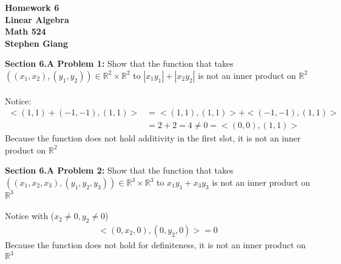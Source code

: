 \documentclass[12pt]{article}
\begin{document}
	
	\begin{center}
		\textbf{Homework 6} \\
		\textbf{Linear Algebra} \\
		\textbf{Math 524} \\
		\textbf{Stephen Giang} \\
	\end{center}

\noindent \textbf{Section 6.A Problem 1: }Show that the function that takes $\left((x_1,x_2),(y_1,y_2)\right) \in \mathbb{R}^2 \times \mathbb{R}^2$ to $|x_1y_1| + |x_2y_2|$ is not an inner product on $\mathbb{R}^2$
\\ \\
Notice: 
	\begin{align*}
		<(1,1) + (-1,-1) , (1,1)> &= <(1,1),(1,1)> + <(-1,-1),(1,1)> \\
		&=2 + 2 = 4 \not = 0 = <(0,0),(1,1)>
	\end{align*}
Because the function does not hold additivity in the first slot, it is not an inner product on $\mathbb{R}^2$

\vspace{\baselineskip}
\vspace{\baselineskip}
\vspace{\baselineskip}

\noindent \textbf{Section 6.A Problem 2: }Show that the function that takes $\left((x_1,x_2,x_3),(y_1,y_2,y_3)\right) \in \mathbb{R}^3 \times \mathbb{R}^3$ to $x_1y_1 + x_3y_3$ is not an inner product on $\mathbb{R}^3$ 
\\ \\
Notice with ($x_2 \not = 0, y_2 \not = 0$)
	\begin{align*}
		<(0,x_2,0),(0,y_2,0)> = 0
	\end{align*}
Because the function does not hold for definiteness, it is not an inner product on $\mathbb{R}^3$

\newpage 
\end{document}
